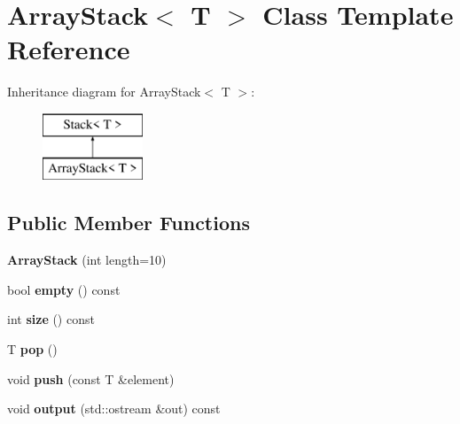 \hypertarget{classArrayStack}{}\section{Array\+Stack$<$ T $>$ Class Template Reference}
\label{classArrayStack}
Inheritance diagram for Array\+Stack$<$ T $>$\+:\begin{figure}[H]
\begin{center}
\leavevmode
\includegraphics[height=2.000000cm]{classArrayStack}
\end{center}
\end{figure}
\subsection*{Public Member Functions}
\begin{DoxyCompactItemize}
\item 
\mbox{\label{classArrayStack_a3079fd948741fa5856ca36881f5ca81e}} 
{\bfseries Array\+Stack} (int length=10)
\item 
\mbox{\label{classArrayStack_a29471ad4a3d1dfeb388e89e733c41b3b}} 
bool {\bfseries empty} () const
\item 
\mbox{\label{classArrayStack_aab54ac6bfa973f73114e3bd110257893}} 
int {\bfseries size} () const
\item 
\mbox{\label{classArrayStack_ad5486caf1345bbe1abeb5a154ee3a54e}} 
T {\bfseries pop} ()
\item 
\mbox{\label{classArrayStack_abec8b059a99c03f85e8e78fc3a5e4c5b}} 
void {\bfseries push} (const T \&element)
\item 
\mbox{\label{classArrayStack_aec6eac3f779260b173210794b2d55b04}} 
void {\bfseries output} (std\+::ostream \&out) const
\end{DoxyCompactItemize}
